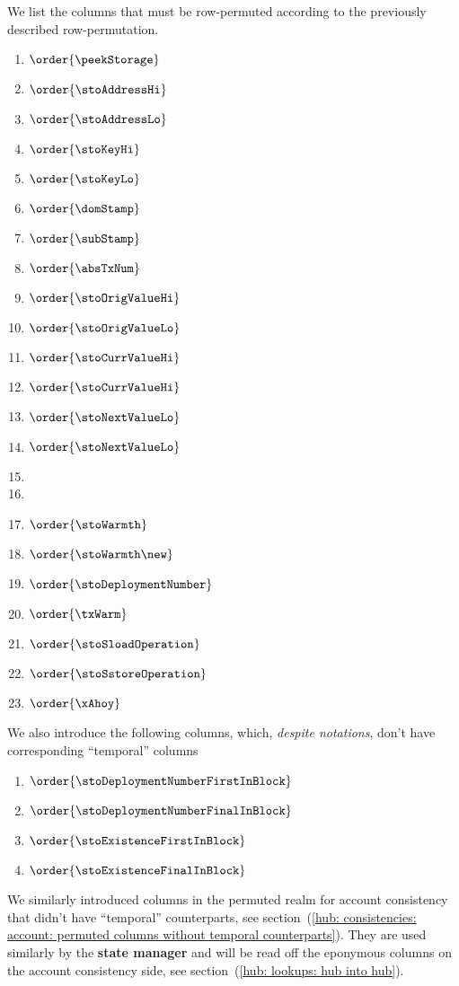 We list the columns that must be row-permuted according to the previously described row-permutation.
\begin{multicols}{3}
	\begin{enumerate}
		\item $\order{\peekStorage}$
		\item $\order{\stoAddressHi}$
		\item $\order{\stoAddressLo}$
		\item $\order{\stoKeyHi}$
		\item $\order{\stoKeyLo}$
		\item $\order{\domStamp}$
		\item $\order{\subStamp}$
		\item $\order{\absTxNum}$
		\item $\order{\stoOrigValueHi}$
		\item $\order{\stoOrigValueLo}$
		\item $\order{\stoCurrValueHi}$
		\item $\order{\stoCurrValueHi}$
		\item $\order{\stoNextValueLo}$
		\item $\order{\stoNextValueLo}$
		\item[\vspace{\fill}]
		\item[\vspace{\fill}]
		\item $\order{\stoWarmth}$
		\item $\order{\stoWarmth\new}$
		\item $\order{\stoDeploymentNumber}$
		\item $\order{\txWarm}$
		\item $\order{\stoSloadOperation}$
		\item $\order{\stoSstoreOperation}$
		\item $\order{\xAhoy}$
	\end{enumerate}
\end{multicols}
We also introduce the following columns, which, \emph{despite notations}, don't have corresponding ``temporal'' columns
\begin{enumerate}
	\item $\order{\stoDeploymentNumberFirstInBlock}$
	\item $\order{\stoDeploymentNumberFinalInBlock}$
	\item $\order{\stoExistenceFirstInBlock}$
	\item $\order{\stoExistenceFinalInBlock}$
\end{enumerate}
\saNote{}
We similarly introduced columns in the permuted realm for account consistency that didn't have ``temporal'' counterparts,
see section~(\ref{hub: consistencies: account: permuted columns without temporal counterparts}).
They are used similarly by the \textbf{state manager} and will be read off the eponymous columns on the account consistency side,
see section~(\ref{hub: lookups: hub into hub}).

